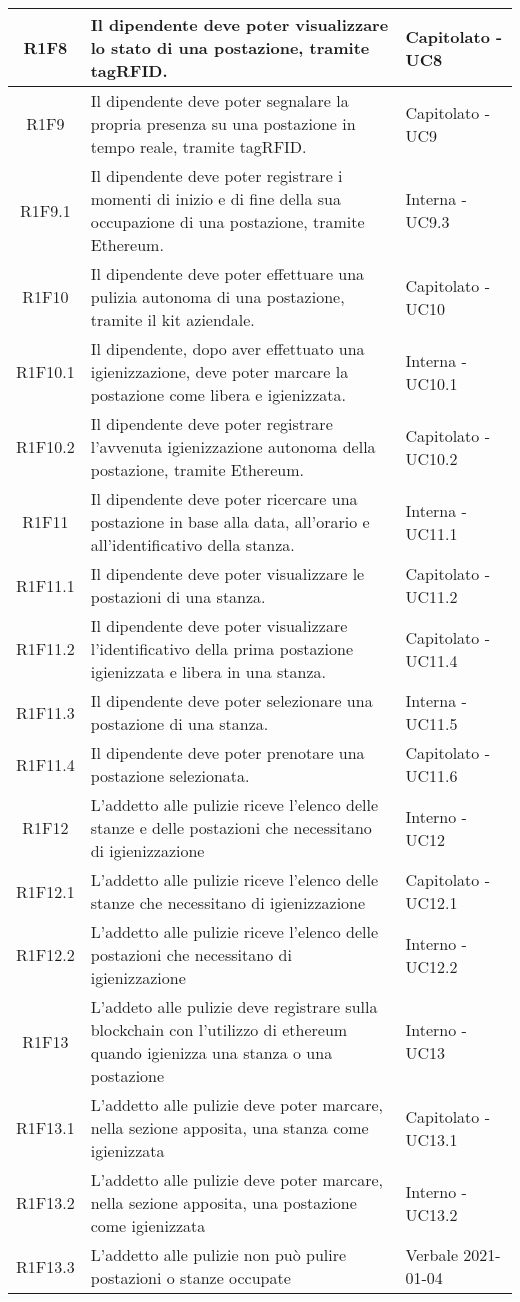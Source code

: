 \begin{center}
\begin{longtable}{|c|p{10cm}|p{4cm}|}
\hline
					R1F8&Il dipendente deve poter visualizzare lo stato di una postazione, tramite tagRFID.	&Capitolato - UC8 	\\
					\hline
			R1F9&Il dipendente deve poter segnalare la propria presenza su una postazione in tempo reale, tramite tagRFID.	&Capitolato - UC9 	\\
		\hline
		R1F9.1&Il dipendente deve poter registrare i momenti di inizio e di fine della sua occupazione di una postazione, tramite Ethereum.	&Interna - UC9.3 	\\
		\hline	
		R1F10&Il dipendente deve poter effettuare una pulizia autonoma di una postazione, tramite il kit aziendale.	&Capitolato - UC10	\\
		\hline		
		R1F10.1&Il dipendente, dopo aver effettuato una igienizzazione, deve poter marcare la postazione come libera e igienizzata.	&Interna - UC10.1	\\
		\hline	
		R1F10.2&Il dipendente deve poter registrare l'avvenuta igienizzazione autonoma della postazione, tramite Ethereum.	&Capitolato - UC10.2	\\
		\hline	
		R1F11&Il dipendente deve poter ricercare una postazione in base alla data, all'orario e all'identificativo della stanza.	&Interna - UC11.1	\\
		\hline
		R1F11.1&Il dipendente deve poter visualizzare le postazioni di una stanza.	&Capitolato - UC11.2	\\
		\hline
		R1F11.2&Il dipendente deve poter visualizzare l'identificativo della prima postazione igienizzata e libera in una stanza.	&Capitolato - UC11.4	\\
		\hline
		R1F11.3&Il dipendente deve poter selezionare una postazione di una stanza.	&Interna - UC11.5	\\
		\hline
		R1F11.4&Il dipendente deve poter prenotare una postazione selezionata.	&Capitolato - UC11.6	\\
		\hline
R1F12&L'addetto alle pulizie riceve l'elenco delle stanze e delle postazioni che necessitano di igienizzazione	& Interno - UC12	\\
						\hline
			R1F12.1&	L'addetto alle pulizie riceve l'elenco delle stanze che necessitano di igienizzazione& 	Capitolato - UC12.1\\
					\hline
			R1F12.2&L'addetto alle pulizie riceve l'elenco delle postazioni che necessitano di igienizzazione	& Interno - UC12.2	\\
					\hline
R1F13&L'addeto alle pulizie deve registrare sulla blockchain con l'utilizzo di ethereum quando igienizza una stanza o una postazione	& Interno - UC13	\\
					\hline
R1F13.1&L'addetto alle pulizie deve poter marcare, nella sezione apposita, una stanza come igienizzata	& Capitolato - UC13.1	\\
						\hline
			R1F13.2&L'addetto alle pulizie deve poter marcare, nella sezione apposita, una postazione come igienizzata	&Interno - UC13.2 	\\
					\hline
			R1F13.3&L'addetto alle pulizie non può pulire postazioni o stanze occupate	& Verbale 2021-01-04	\\
					\hline
						

\end{longtable}
\end{center}
